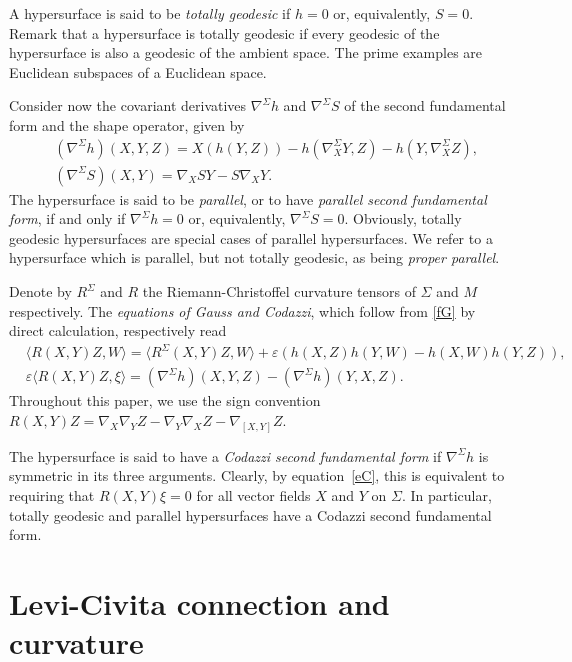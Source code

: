 \documentclass{amsart}
\theoremstyle{plain}
\theoremstyle{remark}
\begin{document}
A hypersurface is said to be \emph{totally geodesic} if $h=0$ or, equivalently, $S=0$. Remark that a hypersurface is totally geodesic if every geodesic of the hypersurface is also a geodesic of the ambient space. The prime examples are Euclidean subspaces of a Euclidean space.

Consider now the covariant derivatives $\nabla^\Sigma h$ and $\nabla^{\Sigma}S$ of the second fundamental form and the shape operator, given by
\begin{align*} 
& (\nabla^\Sigma h)(X,Y,Z) = X(h(Y,Z)) - h(\nabla^\Sigma _XY,Z) - h(Y,\nabla ^\Sigma _XZ), \\
& (\nabla^\Sigma S)(X,Y) = \nabla_X SY - S \nabla_X Y.
\end{align*} 
The hypersurface is said to be \emph{parallel}, or to have \emph{parallel second fundamental form}, if and only if $\nabla^\Sigma h = 0$ or, equivalently, $\nabla^{\Sigma}S=0$. Obviously, totally geodesic hypersurfaces are special cases of parallel hypersurfaces. We refer to a hypersurface which is parallel, but not totally geodesic, as being \textit{proper parallel}.

Denote by $R^\Sigma$ and $R$ the Riemann-Christoffel curvature tensors of $\Sigma$ and $M$ respectively. The {\em equations of Gauss and Codazzi}, which follow from \eqref{fG} by direct calculation, respectively read
%
\begin{align}
& \langle R (X,Y)Z,W \rangle = \langle R^\Sigma (X,Y)Z,W \rangle + \varepsilon \left( h(X,Z)h(Y,W) - h(X,W)h(Y,Z) \right), \label{eG} \\
& \varepsilon \langle R (X,Y)Z,\xi \rangle = (\nabla^\Sigma h)(X,Y,Z) - (\nabla^\Sigma h)(Y,X,Z). \label{eC}
\end{align}
Throughout this paper, we use the sign convention $R(X,Y)Z = \nabla_X \nabla_Y Z - \nabla_Y \nabla_X Z -\nabla_{[X,Y]}Z$. 

The hypersurface is said to have a {\em Codazzi second fundamental form} if $\nabla^{\Sigma} h$ is symmetric in its three arguments. Clearly, by equation~\eqref{eC}, this is equivalent to requiring that $R(X,Y)\xi=0$ for all vector fields $X$ and $Y$ on $\Sigma$. In particular, totally geodesic and parallel hypersurfaces have a Codazzi second fundamental form.


\section{Levi-Civita connection and curvature \label{sec:LC connection}}
\end{document}
